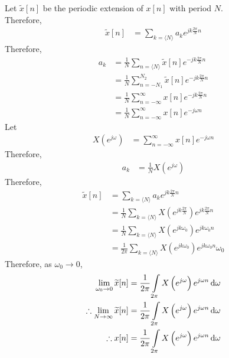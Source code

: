 \documentclass[titlepage, fleqn, a4paper, 12pt, twoside]{article}
\theoremstyle{definition}
\theoremstyle{theorem}
\renewcommand{\tilde}{\widetilde}
\begin{document}
Let $\tilde{x}[n]$ be the periodic extension of $x[n]$ with period $N$.\\
Therefore,
\begin{align*}
	\tilde{x}[n] &= \sum\limits_{k = \langle N \rangle} a_k e^{j k \frac{2 \pi}{N} n}
\end{align*}
Therefore,
\begin{align*}
	a_k &= \frac{1}{N} \sum\limits_{n = \langle N \rangle} \tilde{x}[n] e^{-j k \frac{2 \pi}{N} n}\\
	&= \frac{1}{N} \sum\limits_{n = -N_1}^{N_2} \tilde{x}[n] e^{-j k \frac{2 \pi}{N} n}\\
	&= \frac{1}{N} \sum\limits_{n = -\infty}^{\infty} x[n] e^{-j k \frac{2 \pi}{N} n}\\
	&= \frac{1}{N} \sum\limits_{n = -\infty}^{\infty} x[n] e^{-j \omega n}
\end{align*}
Let
\begin{align*}
	X\left( e^{j \omega} \right) &= \sum\limits_{n = -\infty}^{\infty} x[n] e^{-j \omega n}
\end{align*}
Therefore,
\begin{align*}
	a_k &= \frac{1}{N} X\left( e^{j \omega} \right)
\end{align*}
Therefore,
\begin{align*}
	\tilde{x}[n] &= \sum\limits_{k = \langle N \rangle} a_k e^{j k \frac{2 \pi}{N} n}\\
	&= \frac{1}{N} \sum\limits_{k = \langle N \rangle} X\left( e^{j k \frac{2 \pi}{N}} \right) e^{j k \frac{2 \pi}{N} n}\\
	&= \frac{1}{N} \sum\limits_{k = \langle N \rangle} X\left( e^{j k \omega_0} \right) e^{j k \omega_0 n}\\
	&= \frac{1}{2 \pi} \sum\limits_{k = \langle N \rangle} X\left( e^{j k \omega_0} \right) e^{j k \omega_0 n} \omega_0
\end{align*}
Therefore, as $\omega_0 \to 0$,
\begin{align*}
	\lim\limits_{\omega_0 \to 0} \tilde{x}[n] &= \frac{1}{2 \pi} \int\limits_{2 \pi} X\left( e^{j \omega} \right) e^{j \omega n} \dif \omega\\
	\therefore \lim\limits_{N \to \infty} \tilde{x}[n] &= \frac{1}{2 \pi} \int\limits_{2 \pi} X\left( e^{j \omega} \right) e^{j \omega n} \dif \omega\\
	\therefore x[n] &= \frac{1}{2 \pi} \int\limits_{2 \pi} X\left( e^{j \omega} \right) e^{j \omega n} \dif \omega\\
\end{align*}
\end{document}
